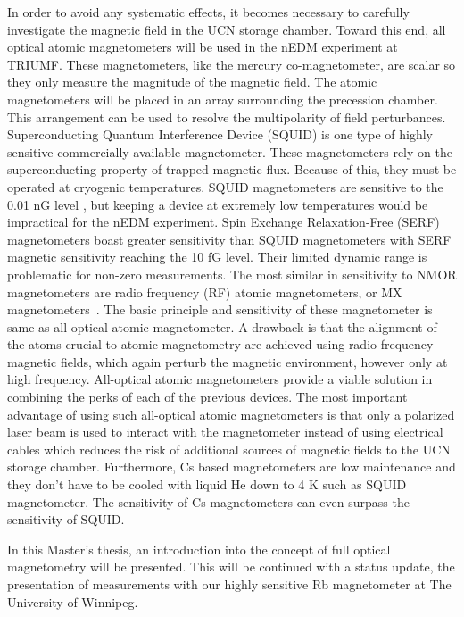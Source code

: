In order to avoid any systematic effects, it becomes necessary to carefully investigate the magnetic field in the UCN storage chamber.  Toward this end, all optical atomic magnetometers will be used in the nEDM experiment at TRIUMF.  These magnetometers, like the mercury co-magnetometer, are scalar so they only measure the magnitude of the magnetic field.  The atomic  magnetometers will be placed in an array surrounding the precession chamber. This arrangement can be used to resolve the multipolarity of field perturbances. Superconducting Quantum Interference Device (SQUID) is one type of highly sensitive commercially available  magnetometer. These magnetometers rely on the superconducting property of trapped magnetic flux. Because of this, they must be operated at cryogenic temperatures. SQUID magnetometers are sensitive to the 0.01 nG level \cite{doi:10.1063/1.3491215}, but keeping a device at extremely low temperatures would be impractical for the nEDM experiment. Spin Exchange Relaxation-Free (SERF) magnetometers boast greater sensitivity than SQUID magnetometers with SERF magnetic sensitivity reaching the 10 fG level\cite{doi:10.1063/1.3491215}. Their limited dynamic range is problematic for non-zero measurements. The most similar in sensitivity to NMOR magnetometers are radio frequency (RF) atomic magnetometers, or MX magnetometers~\cite{Groeger2006}. The basic principle and sensitivity of these magnetometer is same as all-optical atomic magnetometer. A drawback is that the alignment of the atoms crucial to atomic magnetometry are achieved using radio frequency magnetic fields, which again perturb the magnetic
environment, however only at high frequency.  All-optical atomic magnetometers provide a viable solution in combining the perks of each of the previous devices. The most important advantage of using such all-optical atomic magnetometers is that only a polarized laser beam is used to interact with the magnetometer instead of using electrical cables which reduces the risk of additional sources of magnetic fields to the UCN storage chamber. Furthermore, Cs based magnetometers are low  maintenance and they don't have to be cooled with liquid He down to 4 K such as SQUID magnetometer.  The sensitivity of Cs magnetometers can even surpass the sensitivity of SQUID.

In this Master's thesis, an introduction into the concept of full
optical magnetometry will be presented. This will be continued with a
status update, the presentation of measurements with our highly
sensitive Rb magnetometer at The University of Winnipeg.

